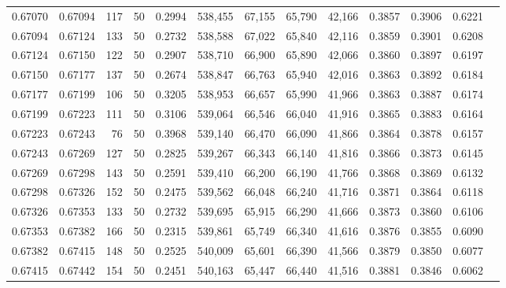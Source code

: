 \begin{tabular}{rrrrrrrrrrrrr}
0.67070 & 0.67094 &   117 &  50 &                                     0.2994 & 538,455 &  67,155 &  65,790 &  42,166 & 0.3857 & 0.3906 & 0.6221 \\
0.67094 & 0.67124 &   133 &  50 &                                     0.2732 & 538,588 &  67,022 &  65,840 &  42,116 & 0.3859 & 0.3901 & 0.6208 \\
0.67124 & 0.67150 &   122 &  50 &                                     0.2907 & 538,710 &  66,900 &  65,890 &  42,066 & 0.3860 & 0.3897 & 0.6197 \\
0.67150 & 0.67177 &   137 &  50 &                                     0.2674 & 538,847 &  66,763 &  65,940 &  42,016 & 0.3863 & 0.3892 & 0.6184 \\
0.67177 & 0.67199 &   106 &  50 &                                     0.3205 & 538,953 &  66,657 &  65,990 &  41,966 & 0.3863 & 0.3887 & 0.6174 \\
0.67199 & 0.67223 &   111 &  50 &                                     0.3106 & 539,064 &  66,546 &  66,040 &  41,916 & 0.3865 & 0.3883 & 0.6164 \\
0.67223 & 0.67243 &    76 &  50 &                                     0.3968 & 539,140 &  66,470 &  66,090 &  41,866 & 0.3864 & 0.3878 & 0.6157 \\
0.67243 & 0.67269 &   127 &  50 &                                     0.2825 & 539,267 &  66,343 &  66,140 &  41,816 & 0.3866 & 0.3873 & 0.6145 \\
0.67269 & 0.67298 &   143 &  50 &                                     0.2591 & 539,410 &  66,200 &  66,190 &  41,766 & 0.3868 & 0.3869 & 0.6132 \\
0.67298 & 0.67326 &   152 &  50 &                                     0.2475 & 539,562 &  66,048 &  66,240 &  41,716 & 0.3871 & 0.3864 & 0.6118 \\
0.67326 & 0.67353 &   133 &  50 &                                     0.2732 & 539,695 &  65,915 &  66,290 &  41,666 & 0.3873 & 0.3860 & 0.6106 \\
0.67353 & 0.67382 &   166 &  50 &                                     0.2315 & 539,861 &  65,749 &  66,340 &  41,616 & 0.3876 & 0.3855 & 0.6090 \\
0.67382 & 0.67415 &   148 &  50 &                                     0.2525 & 540,009 &  65,601 &  66,390 &  41,566 & 0.3879 & 0.3850 & 0.6077 \\
0.67415 & 0.67442 &   154 &  50 &                                     0.2451 & 540,163 &  65,447 &  66,440 &  41,516 & 0.3881 & 0.3846 & 0.6062 \\

\end{tabular}
